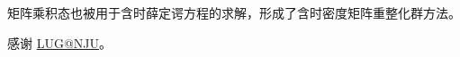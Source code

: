 \documentclass[
    ]{njuthesis}
\begin{document}
矩阵乘积态也被用于含时薛定谔方程的求解，形成了含时密度矩阵重整化群方法\cite{schollwock2011}。


\printbibliography


\begin{acknowledgement}
    感谢 \href{https://git.nju.edu.cn/nju-lug/lug-introduction}{LUG@NJU}。
\end{acknowledgement}


\appendix


\end{document}
